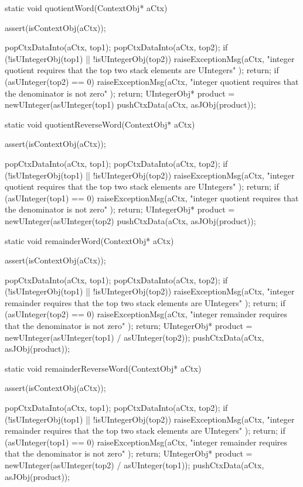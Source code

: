 \startCCode
static void quotientWord(ContextObj* aCtx) {
  assert(isContextObj(aCtx));

  popCtxDataInto(aCtx, top1);
  popCtxDataInto(aCtx, top2);
  if (!isUIntegerObj(top1) || !isUIntegerObj(top2)) {
    raiseExceptionMsg(aCtx,
      "integer quotient requires that the top two stack elements are UIntegers"
    );
    return;
  }
  if (asUInteger(top2) == 0) {
    raiseExceptionMsg(aCtx,
      "integer quotient requires that the denominator is not zero"
    );
    return;
  }
  UIntegerObj* product = newUInteger(asUInteger(top1) %
  pushCtxData(aCtx, asJObj(product));
}

static void quotientReverseWord(ContextObj* aCtx) {
  assert(isContextObj(aCtx));

  popCtxDataInto(aCtx, top1);
  popCtxDataInto(aCtx, top2);
  if (!isUIntegerObj(top1) || !isUIntegerObj(top2)) {
    raiseExceptionMsg(aCtx,
      "integer quotient requires that the top two stack elements are UIntegers"
    );
    return;
  }
  if (asUInteger(top1) == 0) {
    raiseExceptionMsg(aCtx,
      "integer quotient requires that the denominator is not zero"
    );
    return;
  }
  UIntegerObj* product = newUInteger(asUInteger(top2) %
  pushCtxData(aCtx, asJObj(product));
}

static void remainderWord(ContextObj* aCtx) {
  assert(isContextObj(aCtx));

  popCtxDataInto(aCtx, top1);
  popCtxDataInto(aCtx, top2);
  if (!isUIntegerObj(top1) || !isUIntegerObj(top2)) {
    raiseExceptionMsg(aCtx,
      "integer remainder requires that the top two stack elements are UIntegers"
    );
    return;
  }
  if (asUInteger(top2) == 0) {
    raiseExceptionMsg(aCtx,
      "integer remainder requires that the denominator is not zero"
    );
    return;
  }
  UIntegerObj* product = newUInteger(asUInteger(top1) / asUInteger(top2));
  pushCtxData(aCtx, asJObj(product));
}

static void remainderReverseWord(ContextObj* aCtx) {
  assert(isContextObj(aCtx));

  popCtxDataInto(aCtx, top1);
  popCtxDataInto(aCtx, top2);
  if (!isUIntegerObj(top1) || !isUIntegerObj(top2)) {
    raiseExceptionMsg(aCtx,
      "integer remainder requires that the top two stack elements are UIntegers"
    );
    return;
  }
  if (asUInteger(top1) == 0) {
    raiseExceptionMsg(aCtx,
      "integer remainder requires that the denominator is not zero"
    );
    return;
  }
  UIntegerObj* product = newUInteger(asUInteger(top2) / asUInteger(top1));
  pushCtxData(aCtx, asJObj(product));
}
\stopCCode

